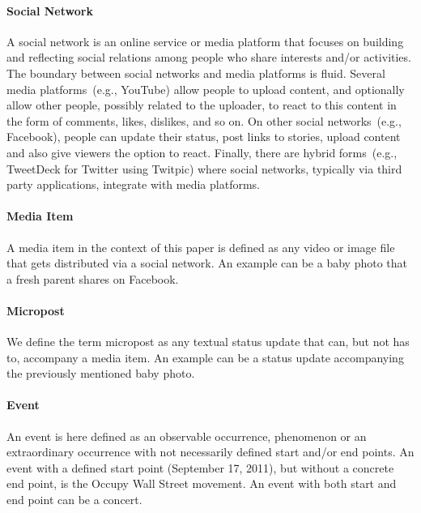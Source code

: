 \documentclass{acm_proc_article-sp}
\begin{document}
\paragraph{Social Network}
A social network is an online service or media platform that focuses on building and reflecting social relations among people who share interests and/or activities.
The boundary between social networks and media platforms is fluid.
Several media platforms~(e.g., YouTube) allow people to upload content,
and optionally allow other people, possibly related to the uploader,
to react to this content in the form of comments, likes, dislikes, and so on.
On other social networks~(e.g., Facebook), people can update their status, post links to stories,
upload content and also give viewers the option to react.
Finally, there are hybrid forms~(e.g., TweetDeck for Twitter using Twitpic) where social networks,
typically via third party applications,
integrate with media platforms.

\paragraph{Media Item}
A media item in the context of this paper is defined as any video or image file that gets distributed via a social network.
An example can be a baby photo that a fresh parent shares on Facebook.

\paragraph{Micropost}
We define the term micropost as any textual status update that can,
but not has to,
accompany a media item.
An example can be a status update accompanying the previously mentioned baby photo. %
\paragraph{Event}
An event is here defined as an observable occurrence, phenomenon or an extraordinary occurrence with not necessarily defined start and/or end points.
An event with a defined start point (September 17, 2011), but without a concrete end point, is the Occupy Wall Street movement.
An event with both start and end point can be a concert.
\end{document}
